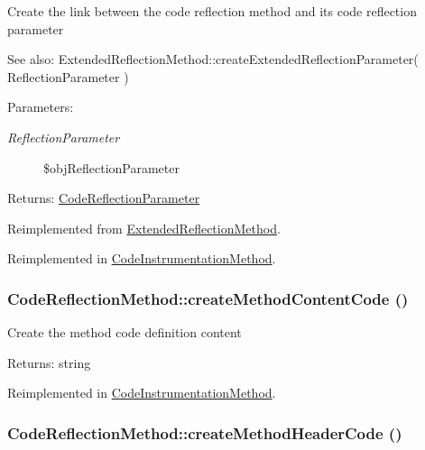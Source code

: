 Create the link between the code reflection method and its code reflection parameter

\begin{Desc}
\item[See also:]ExtendedReflectionMethod::createExtendedReflectionParameter( ReflectionParameter ) \end{Desc}
\begin{Desc}
\item[Parameters:]
\begin{description}
\item[{\em ReflectionParameter}]\$objReflectionParameter \end{description}
\end{Desc}
\begin{Desc}
\item[Returns:]\hyperlink{class_code_reflection_parameter}{CodeReflectionParameter} \end{Desc}


Reimplemented from \hyperlink{class_extended_reflection_method_a7d2760c2914c0ad6428171c4ca61503}{ExtendedReflectionMethod}.

Reimplemented in \hyperlink{class_code_instrumentation_method_d4a17b83d9e1fd997263bc1a9982ae3c}{CodeInstrumentationMethod}.\hypertarget{class_code_reflection_method_4aa609e822a988c2577185932cad79eb}{
\subsubsection[{createMethodContentCode}]{\setlength{\rightskip}{0pt plus 5cm}CodeReflectionMethod::createMethodContentCode ()}}
\label{class_code_reflection_method_4aa609e822a988c2577185932cad79eb}


Create the method code definition content

\begin{Desc}
\item[Returns:]string \end{Desc}


Reimplemented in \hyperlink{class_code_instrumentation_method_731590867f98da76937a4e5a93ec2023}{CodeInstrumentationMethod}.\hypertarget{class_code_reflection_method_c4b3d9a1c136135c42a66302f52c66c5}{
\subsubsection[{createMethodHeaderCode}]{\setlength{\rightskip}{0pt plus 5cm}CodeReflectionMethod::createMethodHeaderCode ()}}
\label{class_code_reflection_method_c4b3d9a1c136135c42a66302f52c66c5}


